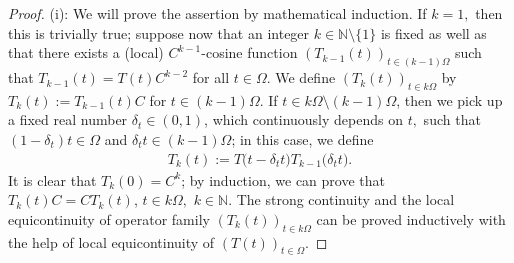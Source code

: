 \documentclass{amsart}
\theoremstyle{definition}
\theoremstyle{remark}
\numberwithin{equation}{section}
\begin{document}
\begin{proof}
(i): We will prove the assertion by mathematical induction. If $k=1,$ then this is trivially true; suppose now that an integer $k\in {\mathbb N} \setminus \{1\}$ is fixed as well as that there exists a (local) $C^{k-1}$-cosine function $(T_{k-1}(t))_{t\in (k-1)\Omega}$ such that $T_{k-1}(t)=T(t)C^{k-2}$ for all $t\in \Omega.$ We define $(T_{k}(t))_{t\in k\Omega}$ by $T_{k}(t):=T_{k-1}(t)C$ for $t\in (k-1) \Omega$. If $t\in k\Omega \setminus (k-1)\Omega$, then we pick up a fixed real number $\delta_{t} \in (0,1)$, which continuously depends on $t,$ such that $(1-\delta_{t})t\in \Omega $ and $\delta_{t}t\in (k-1)\Omega$; in this case, we define 
\begin{align}\label{se}
T_{k}(t):=T\bigl(t-\delta_{t}t\bigr)T_{k-1}\bigl(\delta_{t}t\bigr).
\end{align} 
It is clear that $T_{k}(0)=C^{k}$; by induction, we can prove that $T_{k}(t)C=CT_{k}(t)$, $t\in k\Omega,$ $k\in {\mathbb N}.$ The strong continuity and the local equicontinuity of operator family $(T_{k}(t))_{t\in k\Omega}$ can be proved inductively with the help of local equicontinuity of $(T(t))_{t\in \Omega}$.


\end{proof}
\end{document}
